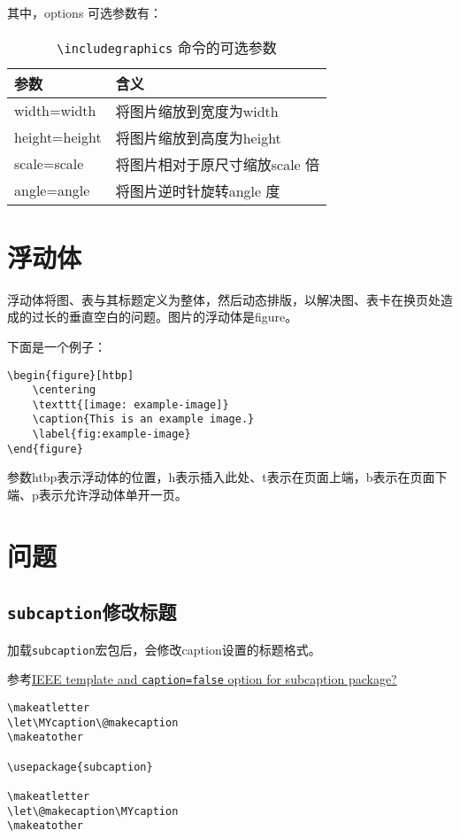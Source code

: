 其中，options 可选参数有：

\begin{table}[htp]
    \centering
    \caption{ \lstinline{\includegraphics} 命令的可选参数}\label{tbl:graphics-options}
    \begin{tabular}{lp{18em}}
        \hline
        \textbf{参数}     & \textbf{含义}          \\
        \hline
        width={width}   & 将图片缩放到宽度为{width}     \\
        height={height} & 将图片缩放到高度为{height}    \\
        scale={scale}   & 将图片相对于原尺寸缩放{scale} 倍 \\
        angle={angle}   & 将图片逆时针旋转{angle} 度    \\
        \hline
    \end{tabular}
\end{table}

\section{浮动体}\label{sec:figure-float}

浮动体将图、表与其标题定义为整体，然后动态排版，以解决图、表卡在换页处造成的过长的垂直空白的问题。图片的浮动体是figure。

下面是一个例子：
\begin{lstlisting}
\begin{figure}[htbp]
    \centering
    \texttt{[image: example-image]}
    \caption{This is an example image.}
    \label{fig:example-image}
\end{figure}
\end{lstlisting}

参数htbp表示浮动体的位置，h表示插入此处、t表示在页面上端，b表示在页面下端、p表示允许浮动体单开一页。

\section{问题}
\subsection{\lstinline{subcaption}修改标题}\label{subsec:figure-subcaption}
加载\lstinline|subcaption|宏包后，会修改caption设置的标题格式。

参考\href{https://tex.stackexchange.com/questions/154435/ieee-template-and-caption-false-option-for-subcaption-package}{IEEE template and \lstinline{caption=false} option for subcaption package?}
\begin{lstlisting}
\makeatletter
\let\MYcaption\@makecaption
\makeatother

\usepackage{subcaption}

\makeatletter
\let\@makecaption\MYcaption
\makeatother
\end{lstlisting}


